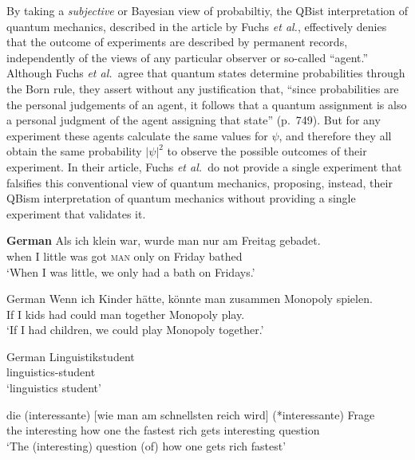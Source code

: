\documentclass[prb,preprint]{revtex4-1}
\begin{document}
By taking a  {\it subjective} or Bayesian view of probabiltiy,  the QBist interpretation of quantum mechanics, described in the article by  Fuchs {\it et al.}, effectively denies that the outcome of experiments are described by permanent records, independently of the views of any particular  observer or so-called ``agent.''  Although Fuchs {\it et al.\ }agree that quantum states determine probabilities through the Born rule, they assert  without any justification that,  ``since probabilities are the personal judgements of an agent, it follows that a quantum assignment is also a personal judgment of the agent assigning that state'' (p.~749).  But for any  experiment  these  agents  calculate the same values for $\psi$, and therefore they all  obtain the same probability $|\psi |^2$  to observe the possible outcomes of their experiment.  In their article, Fuchs {\it et al.\ }do not provide a single experiment that falsifies  this conventional view of quantum mechanics, proposing, instead, their QBism interpretation of quantum mechanics without providing a single experiment that validates it. 




      \ea\label{ex:egerland:3}
      \textbf{German}
      \gll Als   ich  klein  war,  wurde  man  nur  am  Freitag  gebadet. \\
         when  I     little  was   got     \textsc{man}  only  on    Friday  bathed\\
      \glt ‘When I was little, we only had a bath on Fridays.’
      \z

      \ea\label{ex:egerland:4}
      German
      \gll Wenn  ich  Kinder  hätte,  könnte  man  zusammen  Monopoly  spielen.\\
            If      I    kids    had  could    man  together    Monopoly  play.\\
      \glt ‘If I had children, we could play Monopoly together.’
      \z


      \ea\label{ex:t2}
      German
         \gll Linguistikstudent      \\
      linguistics-student \\
      \glt	`linguistics student'\\
      \z

      \ea\label{ex:t5}
         \gll die (interessante) [wie man am schnellsten reich wird] (*interessante) Frage\\
         the interesting	  how one  the fastest	   rich  gets	interesting    question\\
      \glt	`The (interesting) question (of) how one gets rich fastest'
      \z
\end{document}
